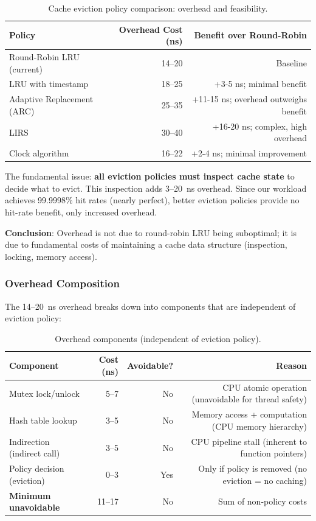 \documentclass[sigplan,final]{acmart}
\begin{document}
\begin{table}[h]
\centering
\caption{Cache eviction policy comparison: overhead and feasibility.}
\label{tab:eviction-policies}
\begin{tabular}{@{}lrr@{}}
\toprule
\textbf{Policy} & \textbf{Overhead Cost (ns)} & \textbf{Benefit over Round-Robin} \\
\midrule
Round-Robin LRU (current) & 14--20 & Baseline \\
LRU with timestamp & 18--25 & +3-5 ns; minimal benefit \\
Adaptive Replacement (ARC) & 25--35 & +11-15 ns; overhead outweighs benefit \\
LIRS & 30--40 & +16-20 ns; complex, high overhead \\
Clock algorithm & 16--22 & +2-4 ns; minimal improvement \\
\bottomrule
\end{tabular}
\end{table}

The fundamental issue: \textbf{all eviction policies must inspect cache state} to decide what to
evict. This inspection adds 3--20~ns overhead. Since our workload achieves 99.9998\% hit rates
(nearly perfect), better eviction policies provide no hit-rate benefit, only increased overhead.

\textbf{Conclusion}: Overhead is not due to round-robin LRU being suboptimal; it is due to
fundamental costs of maintaining a cache data structure (inspection, locking, memory access).

\subsubsection{Overhead Composition}

The 14--20~ns overhead breaks down into components that are independent of eviction policy:

\begin{table}[h]
\centering
\caption{Overhead components (independent of eviction policy).}
\label{tab:overhead-components}
\begin{tabular}{@{}lrrr@{}}
\toprule
\textbf{Component} & \textbf{Cost (ns)} & \textbf{Avoidable?} & \textbf{Reason} \\
\midrule
Mutex lock/unlock & 5--7 & No & CPU atomic operation (unavoidable for thread safety) \\
Hash table lookup & 3--5 & No & Memory access + computation (CPU memory hierarchy) \\
Indirection (indirect call) & 3--5 & No & CPU pipeline stall (inherent to function pointers) \\
Policy decision (eviction) & 0--3 & Yes & Only if policy is removed (no eviction = no caching) \\
\midrule
\textbf{Minimum unavoidable} & 11--17 & No & Sum of non-policy costs \\
\bottomrule
\end{tabular}
\end{table}
\end{document}
